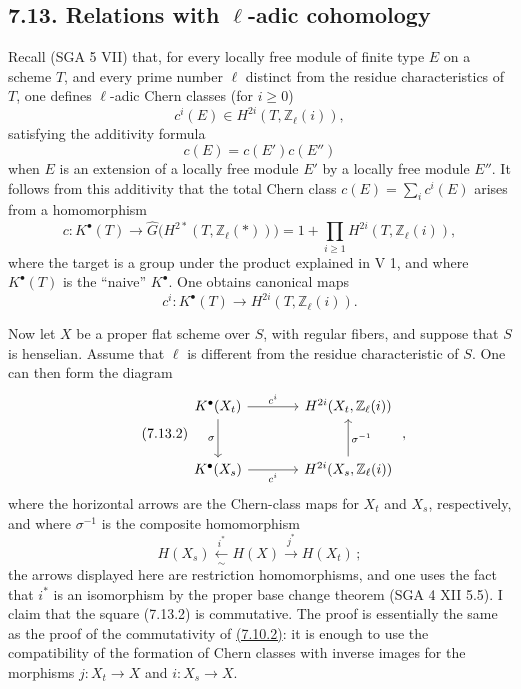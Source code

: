 \subsection*{7.13. Relations with $\ell$-adic cohomology}
Recall (SGA 5 VII) that, for every locally free module of finite type $E$ on
a scheme $T$, and every prime number $\ell$ distinct from the residue
characteristics of $T$, one defines $\ell$-adic Chern classes (for $i\geq0$)
\[
c^i(E)\in H^{2i}(T,\mathbb Z_\ell(i)),
\]
satisfying the additivity formula
\[
c(E)=c(E')c(E'')
\]
when $E$ is an extension of a locally free module $E'$ by a locally free
module $E''$. It follows from this additivity that the total Chern class
$c(E)=\sum_i c^i(E)$ arises from a homomorphism
\begin{equation}\tag{7.13.0}
c:K^\bullet(T)\longrightarrow
\widehat G\bigl(H^{2*}(T,\mathbb Z_\ell(*))\bigr)
=1+\prod_{i\geq1}H^{2i}(T,\mathbb Z_\ell(i)),
\end{equation}
where the target is a group under the product explained in V 1, and where
$K^\bullet(T)$ is the ``naive'' $K^\bullet$. One obtains canonical maps
\begin{equation}\tag{7.13.1}
c^i:K^\bullet(T)\longrightarrow H^{2i}(T,\mathbb Z_\ell(i)).
\end{equation}

Now let $X$ be a proper flat scheme over $S$, with regular fibers, and suppose
that $S$ is henselian. Assume that $\ell$ is different from the residue
characteristic of $S$. One can then form the diagram
\begin{equation}\tag{7.13.2}
\begin{tikzcd}[column sep=large,row sep=large]
K^\bullet(X_t) \arrow[r,"c^i"] \arrow[d,"\sigma"'] &
H^{2i}(X_t,\mathbb Z_\ell(i))\\
K^\bullet(X_s) \arrow[r,"c^i"'] &
H^{2i}(X_s,\mathbb Z_\ell(i)) \arrow[u,"\sigma^{-1}"']
\end{tikzcd}
\;,
\end{equation}
where the horizontal arrows are the Chern-class maps for $X_t$ and $X_s$,
respectively, and where $\sigma^{-1}$ is the composite homomorphism
\[
H(X_s)\xleftarrow[\sim]{i^*}H(X)\xrightarrow{j^*}H(X_t)\,;
\]
the arrows displayed here are restriction homomorphisms, and one uses the
fact that $i^*$ is an isomorphism by the proper base change theorem
(SGA 4 XII 5.5). I claim that the square (7.13.2) is commutative. The proof is
essentially the same as the proof of the commutativity of \hyperlink{sga6.e10.eq.7-10-2}{(7.10.2)}: it is
enough to use the compatibility of the formation of Chern classes with
inverse images for the morphisms $j:X_t\to X$ and $i:X_s\to X$.

